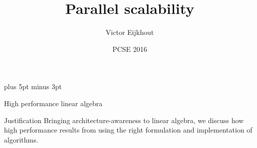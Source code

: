 \documentclass[11pt,headernav]{beamer}
\begin{document}
\parskip=10pt plus 5pt minus 3pt

\title{Parallel scalability}
\author{Victor Eijkhout}
\date{PCSE 2016}

\begin{frame}
  \titlepage
\end{frame}

 {High performance linear algebra}

\begin{frame}{Justification}
  Bringing architecture-awareness to linear algebra,
  we discuss how high performance results from
  using the right formulation and implementation of algorithms.
\end{frame}






\end{document}
